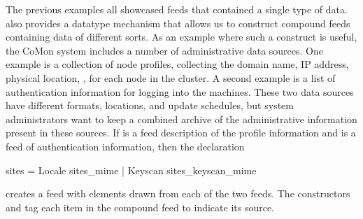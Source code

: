 The previous examples all showcased feeds that contained a single type
of data.  \padsd{} also provides a datatype mechanism that allows us
to construct compound feeds containing data of different sorts.  As an
example where such a construct is useful, the CoMon system includes a
number of administrative data sources.  One example is a collection of
node profiles, collecting the domain name, IP address, physical
location, \etc, for each node in the cluster.  A second example is a
list of authentication information for logging into the machines.
These two data sources have different formats, locations, and update
schedules, but system administrators want to keep a combined archive
of the administrative information present in these sources.  If
 is a feed description of the profile
information and  is a feed of authentication
information, then the declaration

\begin{code}
 sites = 
    Locale  sites_mime
  | Keyscan  sites_keyscan_mime
\end{code}
%
creates a feed with elements drawn from each of the two 
feeds.  The constructors  and  tag each item in
the compound feed to indicate its source. 


